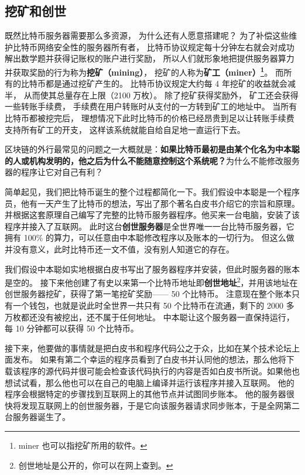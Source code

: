 \subsection{挖矿和创世}
既然比特币服务器需要那么多资源， 为什么还有人愿意搭建呢？ 为了补偿这些维护比特币网络安全性的服务器所有者， 比特币协议规定每十分钟左右就会对成功解出数学题并获得记账权的账户进行奖励， 所以人们就形象地把提供服务器算力并获取奖励的行为称为\textbf{挖矿（mining）}， 挖矿的人称为\textbf{矿工（miner）\footnote{miner 也可以指挖矿所用的软件。}}。 而所有的比特币都是通过挖矿产生的。 比特币协议规定大约每 4 年挖矿的收益就会减半， 从而使其总量存在上限（2100 万枚）。 除了挖矿获得奖励外， 矿工还会获得一些转账手续费， 手续费在用户转账时从支付的一方转到矿工的地址中。 当所有比特币都被挖完后， 理想情况下此时比特币的价格已经昂贵到足以让转账手续费支持所有矿工的开支， 这样该系统就能自给自足地一直运行下去。

区块链的外行最常见的问题之一大概就是：\textbf{如果比特币最初是由某个化名为中本聪的人或机构发明的，他之后为什么不能随意控制这个系统呢？}为什么不能修改服务器的程序让它对自己有利？

简单起见，我们把比特币诞生的整个过程都简化一下。我们假设中本聪是一个程序员，他有一天产生了比特币的想法，写出了那个著名白皮书介绍它的宗旨和原理。并根据这套原理自己编写了完整的比特币服务器程序。他买来一台电脑，安装了该程序并接入了互联网。 此时这台\textbf{创世服务器}是全世界唯一一台比特币服务器，它拥有 100\% 的算力，可以任意由中本聪修改程序以及账本的一切行为。 但这么做并没有意义，此时比特币还一文不值，没有别人知道它的存在。

我们假设中本聪如实地根据白皮书写出了服务器程序并安装，但此时服务器的账本是空的。 接下来他创建了有史以来第一个比特币地址即\textbf{创世地址}\footnote{创世地址是公开的，你可以在网上查到。}，并用该地址在创世服务器挖矿，获得了第一笔挖矿奖励—— 50 个比特币。 注意现在整个账本只有一个钱包，也就是说此时全世界一共只有 50 个比特币在流通，剩下的 2000 多万枚都还没有被挖出，还不属于任何地址。 中本聪让这个服务器一直保持运行，每 10 分钟都可以获得 50 个比特币。

接下来，他要做的事情就是把白皮书和程序代码公之于众，比如在某个技术论坛上面发布。 如果有第二个幸运的程序员看到了白皮书并认同他的想法，那么他将下载该程序的源代码并很可能会检查该代码执行的内容是否如白皮书所说。如果他也想试试看，那么他也可以在自己的电脑上编译并运行该程序并接入互联网。 他的程序会根据特定的步骤找到互联网上的其他节点并试图同步账本。 他的服务器很快将发现互联网上的创世服务器，于是它向该服务器请求同步账本，于是全网第二台服务器诞生了。

